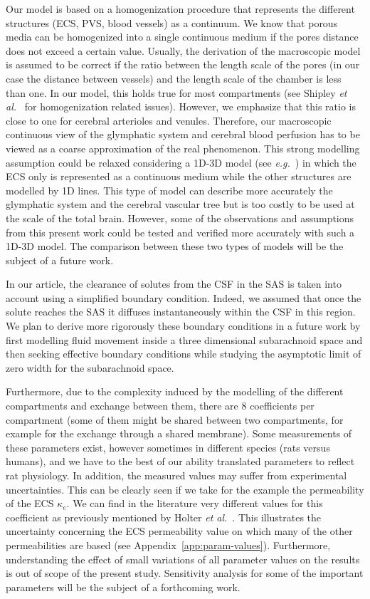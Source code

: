 \documentclass[10pt]{article}
\newcommand{\eg}{\emph{e.g.}\;}
\newcommand{\etal}{\emph{et al.}\;}
\newcommand{\1}{^{(1)}}
\newcommand{\2}{^{(2)}}
\begin{document}
Our model is based on a homogenization procedure that represents the different structures (ECS, PVS, blood vessels) as a continuum. We know that porous media can be homogenized into a single continuous medium if the pores distance does not exceed a certain value. Usually, the derivation of the macroscopic model is assumed to be correct if the ratio between the length scale of the pores (in our case the distance between vessels) and the length scale of the chamber is less than one. In our model, this holds true for most compartments (see Shipley \etal~\cite{shipley-four-comp} for homogenization related issues). However, we emphasize that this ratio is close to one for cerebral arterioles and venules. Therefore, our macroscopic continuous view of the glymphatic system and cerebral blood perfusion has to be viewed as a coarse approximation of the real phenomenon. This strong modelling assumption could be relaxed considering a 1D-3D model (see \eg~\cite{d2008coupling}) in which the ECS only is represented as a continuous medium while the other structures are modelled by 1D lines. This type of model can describe more accurately the glymphatic system and the cerebral vascular tree but is too costly to be used at the scale of the total brain. However, some of the observations and assumptions from this present work could be tested and verified more accurately with such a 1D-3D model. The comparison between these two types of models will be the subject of a future work. 

In our article, the clearance of solutes from the CSF in the SAS is taken into account using a simplified boundary condition. 
Indeed, we assumed that once the solute reaches the SAS it diffuses instantaneously within the CSF in this region.
We plan to derive more rigorously these boundary conditions in a future work by first modelling fluid movement inside a three dimensional subarachnoid space and then seeking effective boundary conditions while studying the asymptotic limit of zero width for the subarachnoid space. 


Furthermore, due to the complexity induced by the modelling of the different compartments and exchange between them, there are $8$ coefficients per compartment (some of them might be shared between two compartments, for example for the exchange through a shared membrane). Some measurements of these parameters  exist, however sometimes in different species (rats versus humans), and we have to the best of our ability translated parameters to reflect rat physiology. In addition, the measured values may suffer from experimental uncertainties. This can be clearly seen if we take for the example the permeability of the ECS $\kappa_e$. We can find in the literature very different values for this coefficient as previously mentioned by Holter \etal~\cite{Holter9894}.
This illustrates the uncertainty concerning the ECS permeability value on which many of the other permeabilities are based (see Appendix~\ref{app:param-values}). Furthermore, understanding the effect of small variations of all parameter values on the results is out of scope of the present study. Sensitivity analysis for some of the important parameters will be the subject of a forthcoming work.    
\end{document}
